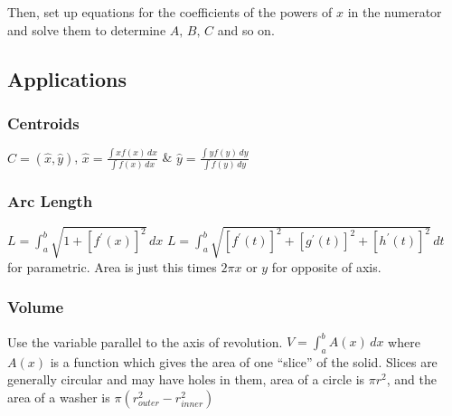 \documentclass[10pt,landscape,letterpaper]{cheatsheet}
\begin{document}
Then, set up equations for the coefficients of the powers of $x$ in the numerator and solve them to determine $A,\,B,\,C$ and so on.
\subsection*{Applications}
\subsubsection*{Centroids}
$C = (\hat{x}, \hat{y})$,
$\hat{x} = \frac{\int xf(x) \,dx}{\int f(x) \,dx}$ \&
$\hat{y} = \frac{\int yf(y) \,dy}{\int f(y) \,dy}$
\subsubsection*{Arc Length}
$L = \int_{a}^{b} \sqrt{1+[f^{\prime}(x)]^2} \,dx$
$L = \int_{a}^{b} \sqrt{[f^{\prime}(t)]^2+[g^{\prime}(t)]^2+[h^{\prime}(t)]^2} \,dt$ for parametric. Area is just this times $2\pi x$ or $y$ for opposite of axis.
\subsubsection*{Volume} Use the variable parallel to the axis of revolution.
$V = \int_{a}^{b} A(x) \,dx$ where $A(x)$ is a function which gives the area
of one ``slice'' of the solid. Slices are generally circular and may have holes in them, area
of a circle is $\pi r^2$, and the area of a washer is $\pi (r_{outer}^2-r_{inner}^2)$
\end{document}
